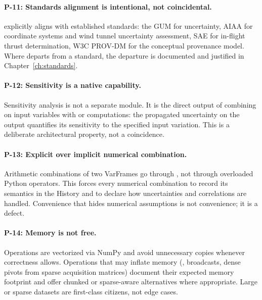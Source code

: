\paragraph{P-11: Standards alignment is intentional, not coincidental.}
\itc{} explicitly aligns with established standards: the GUM for
uncertainty, AIAA for coordinate systems and wind tunnel uncertainty
assessment, SAE for in-flight thrust determination, W3C PROV-DM for the
conceptual provenance model. Where \itc{} departs from a standard, the
departure is documented and justified in
Chapter~\ref{ch:standards}.

\paragraph{P-12: Sensitivity is a native capability.}
Sensitivity analysis is not a separate module. It is the direct output of
combining  on input variables with  or
 computations: the propagated uncertainty on the output
quantifies its sensitivity to the specified input variation. This is a
deliberate architectural property, not a coincidence.

\paragraph{P-13: Explicit over implicit numerical combination.}
Arithmetic combinations of two VarFrames go through , not through overloaded Python operators. This forces every
numerical combination to record its semantics in the History and to declare
how uncertainties and correlations are handled. Convenience that hides
numerical assumptions is not convenience; it is a defect.

\paragraph{P-14: Memory is not free.}
Operations are vectorized via NumPy and avoid unnecessary copies whenever
correctness allows. Operations that may inflate memory (,
broadcasts, dense pivots from sparse acquisition matrices) document their
expected memory footprint and offer chunked or sparse-aware alternatives
where appropriate. Large or sparse datasets are first-class citizens, not
edge cases.
